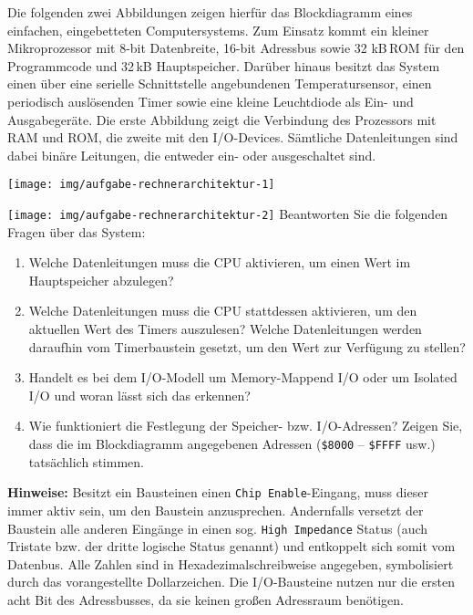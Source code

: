 Die folgenden zwei Abbildungen zeigen hierfür das Blockdiagramm eines einfachen,
eingebetteten Computersystems. Zum Einsatz kommt ein kleiner Mikroprozessor
mit 8-bit Datenbreite, 16-bit Adressbus sowie 32 kB\,ROM für den Programmcode
und 32\,kB Hauptspeicher. Darüber hinaus besitzt das System einen über eine
serielle Schnittstelle angebundenen Temperatursensor, einen periodisch
auslösenden Timer sowie eine kleine Leuchtdiode als Ein- und Ausgabegeräte.
Die erste Abbildung zeigt die Verbindung des Prozessors mit RAM und ROM, die
zweite mit den I/O-Devices. Sämtliche Datenleitungen sind dabei binäre Leitungen,
die entweder ein- oder ausgeschaltet sind.

\bigskip
\texttt{[image: img/aufgabe-rechnerarchitektur-1]}

\texttt{[image: img/aufgabe-rechnerarchitektur-2]}
\bigskip
Beantworten Sie die folgenden Fragen über das System:

\begin{enumerate}
    \item Welche Datenleitungen muss die CPU aktivieren, um einen Wert im
    Hauptspeicher abzulegen?

    \item Welche Datenleitungen muss die CPU stattdessen aktivieren, um den
    aktuellen Wert des Timers auszulesen? Welche Datenleitungen werden daraufhin
    vom Timerbaustein gesetzt, um den Wert zur Verfügung zu stellen?

    \item Handelt es bei dem I/O-Modell um \glqq{}Memory-Mappend I/O\grqq{}
    oder um \glqq{}Isolated I/O\grqq{} und woran lässt sich das erkennen?

    \item Wie funktioniert die Festlegung der Speicher- bzw. I/O-Adressen?
    Zeigen Sie, dass die im Blockdiagramm angegebenen Adressen
    (\texttt{\$8000} -- \texttt{\$FFFF} usw.) tatsächlich stimmen.
\end{enumerate}

\textbf{Hinweise:} Besitzt ein Bausteinen einen \texttt{Chip Enable}-Eingang,
muss dieser immer aktiv sein, um den Baustein anzusprechen. Andernfalls versetzt
der Baustein alle anderen Eingänge in einen sog. \texttt{High Impedance} Status
(auch Tristate bzw. der dritte logische Status genannt) und entkoppelt sich somit
vom Datenbus. Alle Zahlen sind in Hexadezimalschreibweise angegeben, symbolisiert
durch das vorangestellte Dollarzeichen. Die I/O-Bausteine nutzen nur die ersten
acht Bit des Adressbusses, da sie keinen großen Adressraum benötigen.

